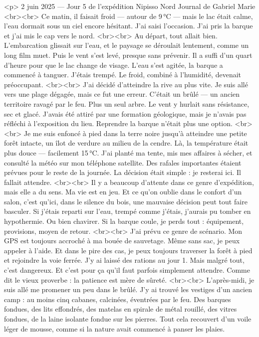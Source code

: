 <p>
2 juin 2025 — Jour 5 de l’expédition Nipisso Nord
Journal de Gabriel Marie
<br><br>
Ce matin, il faisait froid — autour de 9 °C — mais le lac était calme, l’eau dormait sous un ciel encore hésitant. J’ai saisi l’occasion. J’ai pris la barque et j’ai mis le cap vers le nord.
<br><br>
Au départ, tout allait bien. L’embarcation glissait sur l’eau, et le paysage se déroulait lentement, comme un long film muet. Puis le vent s’est levé, presque sans prévenir. Il a suffi d’un quart d’heure pour que le lac change de visage. L’eau s’est agitée, la barque a commencé à tanguer. J’étais trempé. Le froid, combiné à l’humidité, devenait préoccupant.
<br><br>
J’ai décidé d’atteindre la rive au plus vite. Je suis allé vers une plage dégagée, mais ce fut une erreur. C’était un brûlé — un ancien territoire ravagé par le feu. Plus un seul arbre. Le vent y hurlait sans résistance, sec et glacé. J’avais été attiré par une formation géologique, mais je n’avais pas réfléchi à l’exposition du lieu. Reprendre la barque n’était plus une option.
<br><br>
Je me suis enfoncé à pied dans la terre noire jusqu’à atteindre une petite forêt intacte, un îlot de verdure au milieu de la cendre. Là, la température était plus douce — facilement 15 °C. J’ai planté ma tente, mis mes affaires à sécher, et consulté la météo sur mon téléphone satellite. Des rafales importantes étaient prévues pour le reste de la journée. La décision était simple : je resterai ici. Il fallait attendre.
<br><br>
Il y a beaucoup d’attente dans ce genre d’expédition, mais elle a du sens. Ma vie est en jeu. Et ce qu’on oublie dans le confort d’un salon, c’est qu’ici, dans le silence du bois, une mauvaise décision peut tout faire basculer. Si j’étais reparti sur l’eau, trempé comme j’étais, j’aurais pu tomber en hypothermie. Ou bien chavirer. Si la barque coule, je perds tout : équipement, provisions, moyen de retour.
<br><br>
J’ai prévu ce genre de scénario. Mon GPS est toujours accroché à ma bouée de sauvetage. Même sans sac, je peux appeler à l’aide. Et dans le pire des cas, je peux toujours traverser la forêt à pied et rejoindre la voie ferrée. J’y ai laissé des rations au jour 1. Mais malgré tout, c’est dangereux. Et c’est pour ça qu’il faut parfois simplement attendre. Comme dit le vieux proverbe : la patience est mère de sûreté.
<br><br>
L’après-midi, je suis allé me promener un peu dans le brûlé. J’y ai trouvé les vestiges d’un ancien camp : au moins cinq cabanes, calcinées, éventrées par le feu. Des barques fondues, des lits effondrés, des matelas en spirale de métal rouillé, des vitres fondues, de la laine isolante fondue sur les pierres. Tout cela recouvert d’un voile léger de mousse, comme si la nature avait commencé à panser les plaies.
